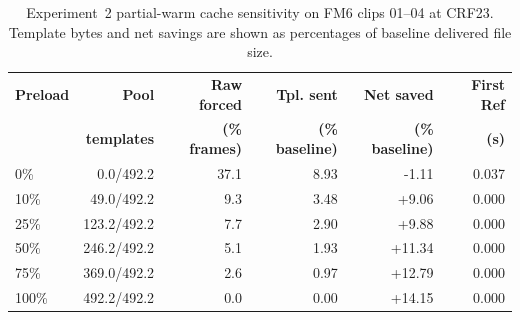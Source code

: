 \begin{table}[t]
  \centering
  \small
  \caption{Experiment~2 partial-warm cache sensitivity on FM6 clips 01--04 at CRF23. Template bytes and net savings are shown as percentages of baseline delivered file size.}
  \label{tab:exp2-partial-warm-fm6}
  \setlength{\tabcolsep}{4pt}
  \begin{tabular}{@{}lrrrrr@{}}
    \toprule
    \textbf{Preload} & \textbf{Pool} & \textbf{Raw forced} & \textbf{Tpl. sent} & \textbf{Net saved} & \textbf{First Ref} \\
    & \textbf{templates} & \textbf{(\% frames)} & \textbf{(\% baseline)} & \textbf{(\% baseline)} & \textbf{(s)} \\
    \midrule
    0\% & 0.0/492.2 & 37.1 & 8.93 & -1.11 & 0.037 \\
    10\% & 49.0/492.2 & 9.3 & 3.48 & +9.06 & 0.000 \\
    25\% & 123.2/492.2 & 7.7 & 2.90 & +9.88 & 0.000 \\
    50\% & 246.2/492.2 & 5.1 & 1.93 & +11.34 & 0.000 \\
    75\% & 369.0/492.2 & 2.6 & 0.97 & +12.79 & 0.000 \\
    100\% & 492.2/492.2 & 0.0 & 0.00 & +14.15 & 0.000 \\
    \bottomrule
  \end{tabular}
\end{table}
